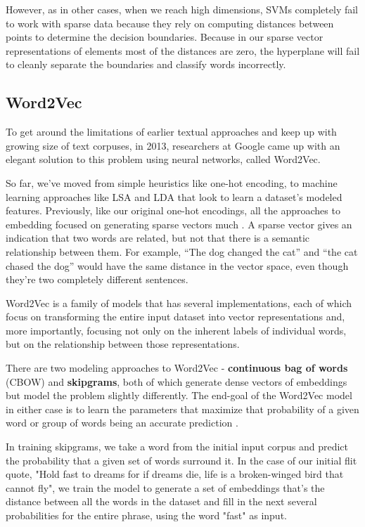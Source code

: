 \documentclass[11pt, table]{diazessay} %
\begin{document}
\begin{sloppypar}
However, as in other cases, when we reach high dimensions, SVMs completely fail to work with sparse data because they rely on computing distances between points to determine the decision boundaries. Because in our sparse vector representations of elements most of the distances are zero, the hyperplane will fail to cleanly separate the boundaries and classify words incorrectly. 

\subsection{Word2Vec}

To get around the limitations of earlier textual approaches and keep up with growing size of text corpuses, in 2013, researchers at Google came up with an elegant solution to this problem using neural networks, called Word2Vec\citep{mikolov2013efficient}.  

So far, we've moved from simple heuristics like one-hot encoding, to machine learning approaches like LSA and LDA that look to learn a dataset's modeled features.  Previously, like our original one-hot encodings, all the approaches to embedding focused on generating sparse vectors much . A sparse vector gives an indication that two words are related, but not that there is a semantic relationship between them. For example, “The dog changed the cat” and “the cat chased the dog” would have the same distance in the vector space, even though they’re two completely different sentences. 

Word2Vec is a family of models that has several implementations, each of which focus on transforming the entire input dataset into vector representations and, more importantly, focusing  not only on the inherent labels of individual words, but on the relationship between those representations. 

There are two modeling approaches to Word2Vec - \textbf{continuous bag of words} (CBOW) and \textbf{skipgrams}, both of which generate dense vectors of embeddings but model the problem slightly differently. The end-goal of the Word2Vec model in either case is to learn the parameters that maximize that probability of a given word or group of words being an accurate prediction \citep{goldberg2014word2vec}. 

In training skipgrams, we take a word from the initial input corpus and predict the probability that a given set of words surround it. In the case of our initial flit quote, "Hold fast to dreams for if dreams die, life is a broken-winged bird that cannot fly", we train the model to generate a set of embeddings that's the distance between all the words in the dataset and fill in the next several probabilities for the entire phrase, using the word "fast" as input.  


\end{sloppypar}
\end{document}
